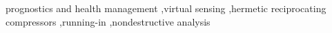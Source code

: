 \documentclass[preprint,11pt,number]{elsarticle}
\begin{document}
% 
% 
% 

\begin{keyword}
prognostics and health management \sep virtual sensing \sep hermetic reciprocating compressors \sep running-in \sep nondestructive analysis
\end{keyword}



\maketitle
\end{document}
